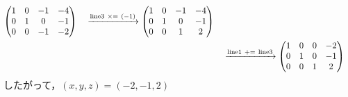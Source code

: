 \documentclass{ltjsarticle}
\begin{document}
\begin{enumerate}
\begin{align*}
\begin{pmatrix}
 1 & 0 & -1 & - 4\\
 0 & 1 & 0 & -1\\
 0 & 0 & -1 & - 2
\end{pmatrix}\ \ \ \xrightarrow{ \text{line} 3 \ \times=\ \left( - 1 \right)} %
\begin{pmatrix}
 1 & 0 & -1 & - 4\\
 0 & 1 & 0 & -1\\
 0 & 0 & 1 & 2
\end{pmatrix}\allowdisplaybreaks\\
&\ \ \ \xrightarrow{ \text{line} 1 \ +=\  \text{line} 3 } %
\begin{pmatrix}
 1 & 0 & 0 & - 2\\
 0 & 1 & 0 & -1\\
 0 & 0 & 1 & 2
\end{pmatrix}
\end{align*}
したがって，$(x, y, z)=(-2, -1, 2)$
\end{enumerate}
\end{document}
